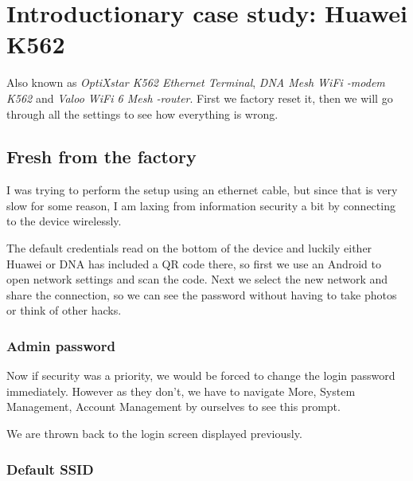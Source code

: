 \documentclass[../wifi-security.tex]{subfiles}
\begin{document}
\chapter{Introductionary case study: Huawei K562}

Also known as \textit{OptiXstar K562 Ethernet Terminal}, \textit{DNA Mesh WiFi -modem K562} and \textit{Valoo WiFi 6 Mesh -router}. First we factory reset it, then we will go through all the settings to see how everything is wrong.


\section{Fresh from the factory}

I was trying to perform the setup using an ethernet cable, but since that is very slow for some reason, I am laxing from information security a bit by connecting to the device wirelessly.



The default credentials read on the bottom of the device and luckily either Huawei or DNA has included a QR code there, so first we use an Android to open network settings and scan the code. Next we select the new network and share the connection, so we can see the password without having to take photos or think of other hacks.


\subsection{Admin password}


Now if security was a priority, we would be forced to change the login password immediately. However as they don't, we have to navigate More, System Management, Account Management by ourselves to see this prompt.


We are thrown back to the login screen displayed previously.


\subsection{Default SSID}
\end{document}
